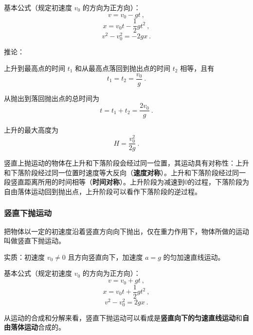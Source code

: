 基本公式（规定初速度 $v_0$ 的方向为正方向）：
\begin{equation}
v=v_0-gt~,
\end{equation}
\begin{equation}
x=v_0t-\frac12gt^2~,
\end{equation}
\begin{equation}
v^2-v_0^2=-2gx~.
\end{equation}

推论：

上升到最高点的时间 $t_1$ 和从最高点落回到抛出点的时间 $t_2$ 相等，且有
\begin{equation}
t_1=t_2=\frac{v_0}{g}~.
\end{equation}

从抛出到落回抛出点的总时间为
\begin{equation}
t=t_1+t_2=\frac{2v_0}{g}~.
\end{equation}

上升的最大高度为
\begin{equation}
H=\frac{v_0^2}{2g}~.
\end{equation}

竖直上抛运动的物体在上升和下落阶段会经过同一位置，其运动具有对称性：上升和下落阶段经过同一位置时速度等大反向（\textbf{速度对称}）。上升和下落阶段经过同一段竖直距离所用的时间相等（\textbf{时间对称}）。上升阶段为减速到0的过程，下落阶段为自由落体运动回到抛出点，上升阶段可以看作下落阶段的逆过程。

\subsubsection{竖直下抛运动}
把物体以一定的初速度沿着竖直方向向下抛出，仅在重力作用下，物体所做的运动叫做竖直下抛运动。

实质：初速度 $v_0\neq0$ 且方向竖直向下，加速度 $a=g$ 的匀加速直线运动。

基本公式（规定初速度 $v_0$ 的方向为正方向）：
\begin{equation}
v=v_0+gt~,
\end{equation}
\begin{equation}
x=v_0t+\frac12gt^2~,
\end{equation}
\begin{equation}
v^2-v_0^2=2gx~.
\end{equation}

从运动的合成和分解来看，竖直下抛运动可以看成是\textbf{竖直向下的匀速直线运动}和\textbf{自由落体运动}合成的。